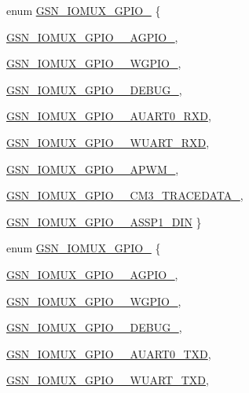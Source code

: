 \begin{DoxyCompactItemize}
\item 
enum \hyperlink{a00519_ab8e14637cbb01784302c471c32135363}{GSN\_\-IOMUX\_\-GPIO\_} \{ \par
\hyperlink{a00519_ab8e14637cbb01784302c471c32135363a61bbcb2a9740c0c2bccf13e4e8c29750}{GSN\_\-IOMUX\_\-GPIO\_\_\-AGPIO\_}, 
\par
\hyperlink{a00519_ab8e14637cbb01784302c471c32135363a1d397aa0229dbe7a9b0b5ff405913c6d}{GSN\_\-IOMUX\_\-GPIO\_\_\-WGPIO\_}, 
\par
\hyperlink{a00519_ab8e14637cbb01784302c471c32135363a78e30c2bd0a8755822ac18a235b9d616}{GSN\_\-IOMUX\_\-GPIO\_\_\-DEBUG\_}, 
\par
\hyperlink{a00519_ab8e14637cbb01784302c471c32135363a6857e76fbad1bad10cc3c9eba74a8cca}{GSN\_\-IOMUX\_\-GPIO\_\_\-AUART0\_\-RXD}, 
\par
\hyperlink{a00519_ab8e14637cbb01784302c471c32135363a8b63a7028b9073db1b8c540761f57edd}{GSN\_\-IOMUX\_\-GPIO\_\_\-WUART\_\-RXD}, 
\par
\hyperlink{a00519_ab8e14637cbb01784302c471c32135363adb6c6aa8a6722230b5af7c799c9cb4be}{GSN\_\-IOMUX\_\-GPIO\_\_\-APWM\_}, 
\par
\hyperlink{a00519_ab8e14637cbb01784302c471c32135363acc1cac1c341c2b5910c6adaa2598ca3a}{GSN\_\-IOMUX\_\-GPIO\_\_\-CM3\_\-TRACEDATA\_}, 
\par
\hyperlink{a00519_ab8e14637cbb01784302c471c32135363ae19648864fdc8c1d7c9ff7b2cbacaa05}{GSN\_\-IOMUX\_\-GPIO\_\_\-ASSP1\_\-DIN}
 \}
\item 
enum \hyperlink{a00519_a2482cd55eb57e3f76b1ce4ac8b2c95c6}{GSN\_\-IOMUX\_\-GPIO\_} \{ \par
\hyperlink{a00519_a2482cd55eb57e3f76b1ce4ac8b2c95c6a9b3051dd05ad52ad0a28f7ccba1b57de}{GSN\_\-IOMUX\_\-GPIO\_\_\-AGPIO\_}, 
\par
\hyperlink{a00519_a2482cd55eb57e3f76b1ce4ac8b2c95c6a56516577a09b0de64727c7b203f638fe}{GSN\_\-IOMUX\_\-GPIO\_\_\-WGPIO\_}, 
\par
\hyperlink{a00519_a2482cd55eb57e3f76b1ce4ac8b2c95c6a4aa6bd3713d63b7a9e8583b071d98e2e}{GSN\_\-IOMUX\_\-GPIO\_\_\-DEBUG\_}, 
\par
\hyperlink{a00519_a2482cd55eb57e3f76b1ce4ac8b2c95c6ae1ed65f05f57b2c118546c516f250f9e}{GSN\_\-IOMUX\_\-GPIO\_\_\-AUART0\_\-TXD}, 
\par
\hyperlink{a00519_a2482cd55eb57e3f76b1ce4ac8b2c95c6a110ce3ca6c23a8570154019baf6ca32e}{GSN\_\-IOMUX\_\-GPIO\_\_\-WUART\_\-TXD}, 

\end{DoxyCompactItemize}
